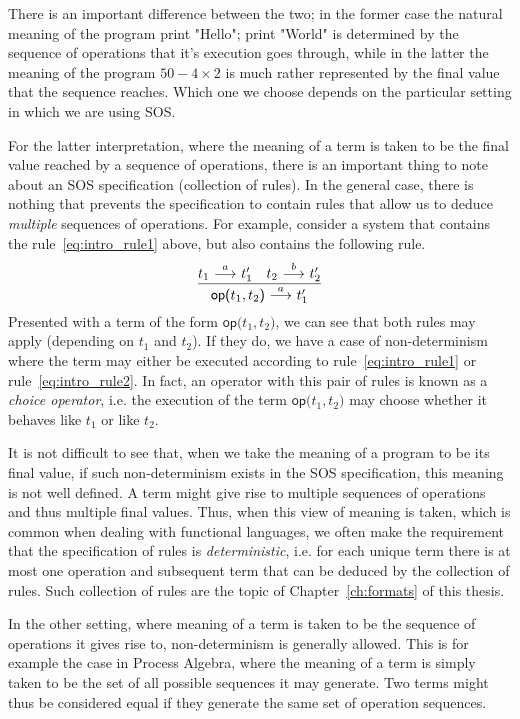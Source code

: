 There is an important difference between the two; in the former case the natural meaning
of the program \textsf{print "Hello"; print "World"} is determined by the sequence
of operations that it's execution goes through, while in the latter the meaning
of the program $50 - 4 \times 2$ is much rather represented by the final value
that the sequence reaches. Which one we choose depends on the particular setting
in which we are using SOS.

For the latter interpretation, where the meaning of a term is taken to be the
final value reached by a sequence of operations, there is an important thing to
note about an SOS specification (collection of rules). In the general case, there
is nothing that prevents the specification to contain rules that allow us to
deduce \emph{multiple} sequences of operations. For example, consider a system
that contains the rule~\ref{eq:intro_rule1} above, but also contains the following
rule.
\begin{equation}\label{eq:intro_rule2}
    \frac{t_1 \ {\stackrel{{a}}{\longrightarrow}}\  t_1' \quad t_2 \ {\stackrel{{b}}{\longrightarrow}}\  t_2'}{\textsf{op(}t_1,t_2\textsf{)}\ {\stackrel{{a}}{\longrightarrow}}\  t_1'}
\end{equation}
Presented with a term of the form $\textsf{op(}t_1,t_2\textsf{)}$, we can see
that both rules may apply (depending on $t_1$ and $t_2$). If they do, we have
a case of non-determinism where the term may either be executed according to
rule~\ref{eq:intro_rule1} or rule~\ref{eq:intro_rule2}. In fact, an operator
with this pair of rules is known as a \emph{choice operator}, i.e. the execution
of the term $\textsf{op(}t_1,t_2\textsf{)}$ may choose whether it behaves like
$t_1$ or like $t_2$.

It is not difficult to see that, when we take the meaning of a program to be its
final value, if such non-determinism exists in the SOS specification, this meaning
is not well defined. A term might give rise to multiple sequences of operations and
thus multiple final values. Thus, when this view of meaning is taken, which is
common when dealing with functional languages, we often make the requirement that
the specification of rules is \emph{deterministic}, i.e. for each unique term
there is at most one operation and subsequent term that can be deduced by the
collection of rules. Such collection of rules are the topic of Chapter~\ref{ch:formats}
of this thesis.

In the other setting, where meaning of a term is taken to be the sequence of
operations it gives rise to, non-determinism is generally allowed. This is for example
the case in Process Algebra, where the meaning of a term is simply taken to be
the set of all possible sequences it may generate. Two terms might thus be considered
equal if they generate the same set of operation sequences.

